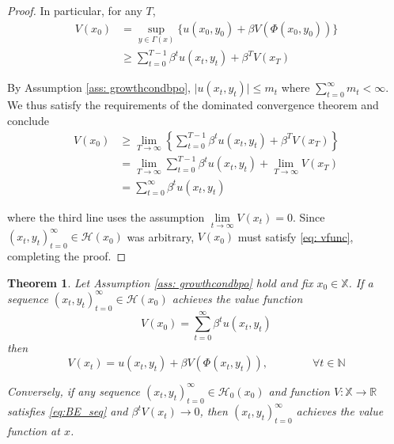 \documentclass[12pt]{ectaart}
\newcommand{\1}{\mathbbm 1}
\theoremstyle{plain}
\newtheorem{theorem}{Theorem}[section]
\theoremstyle{definition}
\begin{document}
\begin{proof}
	In particular, for any $T$, 
	\begin{align*}
	V(x_{0})& = \sup_{y\in \Gamma(x)} \{u(x_{0},y_{0}) + \beta V(\Phi(x_{0},y_{0}))\}\\
	& \geq \sum_{t=0}^{T-1}\beta^{t}u(x_{t},y_{t}) + \beta^{T} V(x_{T})
	\end{align*} 
	
	By Assumption \ref{ass: growthcondbpo}, $\vert u(x_{t},y_{t})\vert \leq m_{t}$ where $\sum_{t=0}^{\infty}m_{t} <\infty$. We thus satisfy the requirements of the dominated convergence theorem and conclude
	\begin{align*}
	V(x_{0})&  \geq \lim_{T\rightarrow \infty}\left\{\sum_{t=0}^{T-1}\beta^{t}u(x_{t},y_{t}) + \beta^{T} V(x_{T})\right\}\\
	& = \lim_{T\rightarrow\infty}\sum_{t=0}^{T-1}\beta^{t}u(x_{t},y_{t}) + \lim_{T\rightarrow\infty}V(x_{T}) \\
	&= \sum_{t=0}^{\infty}\beta^{t}u(x_{t},y_{t})
	\end{align*}
	
	where the third line uses the assumption $\lim\limits_{t\rightarrow \infty}V(x_{t}) = 0$. Since $(x_{t},y_{t})_{t=0}^{\infty}\in \mathcal{H}(x_{0})$ was arbitrary, $V(x_{0})$ must satisfy \eqref{eq: vfunc}, completing the proof. 
	
\end{proof}


\begin{theorem}\label{thm: bpo_prim}
	Let Assumption \ref{ass: growthcondbpo} hold and fix  $x_{0}\in \mathbb{X}$. If a sequence $(x_{t},y_{t})_{t=0}^{\infty}\in \mathcal{H}(x_{0})$ achieves the value function 
	\begin{equation}
	V(x_{0}) = \sum_{t=0}^{\infty}\beta^{t}u(x_{t},y_{t})
	\end{equation}
	then 
	\begin{equation}\label{eq:BE_seq}
	V(x_{t}) = u(x_{t},y_{t})  +\beta V(\Phi(x_{t}, y_{t})), \qquad\qquad \forall t\in \mathbb{N}
	\end{equation}
	
	Conversely, if any sequence $(x_{t},y_{t})_{t=0}^{\infty}\in \mathcal{H}_{0}(x_{0})$ and function $V\colon \mathbb{X}\rightarrow \mathbb{R}$ satisfies \eqref{eq:BE_seq} and $\beta^{t}V(x_{t})\rightarrow 0$, then $(x_{t},y_{t})_{t=0}^{\infty}$ achieves the value function at $x$. 
\end{theorem}
\end{document}
